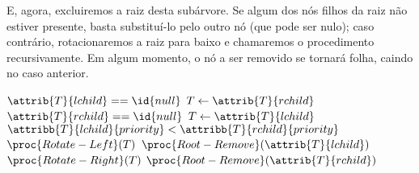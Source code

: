 E, agora, excluiremos a raiz desta subárvore.
Se algum dos nós filhos da raiz não estiver presente,
basta substituí-lo pelo outro nó (que pode ser nulo);
caso contrário,
rotacionaremos a raiz para baixo
e chamaremos o procedimento recursivamente.
Em algum momento,
o nó a ser removido se tornará folha,
caindo no caso anterior.

\begin{codebox}
    \li \If $\attrib{T}{lchild} == \id{null}$
    \li \Then $T \gets \attrib{T}{rchild}$
    \li \ElseIf $\attrib{T}{rchild} == \id{null}$
    \li \Then $T \gets \attrib{T}{lchild}$
    \li \ElseIf $\attribb{T}{lchild}{priority} < \attribb{T}{rchild}{priority}$
    \li \Then
            $\proc{Rotate-Left}(T)$
    \li     $\proc{Root-Remove}(\attrib{T}{lchild})$
    \li \ElseNoIf
    \li     $\proc{Rotate-Right}(T)$
    \li     $\proc{Root-Remove}(\attrib{T}{rchild})$
        \End
\end{codebox}
